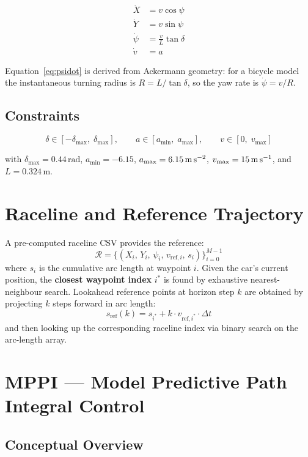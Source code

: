 \documentclass[11pt]{article}
\begin{document}
\begin{align}
\dot{X}   &= v \cos\psi \label{eq:xdot}\\
\dot{Y}   &= v \sin\psi \label{eq:ydot}\\
\dot{\psi} &= \frac{v}{L}\tan\delta \label{eq:psidot}\\
\dot{v}   &= a \label{eq:vdot}
\end{align}

Equation~\eqref{eq:psidot} is derived from Ackermann geometry: for a bicycle
model the instantaneous turning radius is $R = L / \tan\delta$, so the yaw rate
is $\dot{\psi} = v/R$.

\subsection{Constraints}

\[
\delta \in [-\delta_{\max},\; \delta_{\max}], \qquad
a     \in [a_{\min},\; a_{\max}], \qquad
v     \in [0,\; v_{\max}]
\]

with $\delta_{\max} = 0.44\,\text{rad}$, $a_{\min} = -6.15$, $a_{\max} = 6.15\,\text{m\,s}^{-2}$,
$v_{\max} = 15\,\text{m\,s}^{-1}$, and $L = 0.324\,\text{m}$.


\section{Raceline and Reference Trajectory}

A pre-computed raceline CSV provides the reference:
\[
\mathcal{R} = \{(X_i,\, Y_i,\, \psi_i,\, v_{\text{ref},i},\, s_i)\}_{i=0}^{M-1}
\]
where $s_i$ is the cumulative arc length at waypoint $i$.  Given the car's
current position, the \textbf{closest waypoint index} $i^*$ is found by
exhaustive nearest-neighbour search.  Lookahead reference points at horizon
step $k$ are obtained by projecting $k$ steps forward in arc length:
\[
s_{\text{ref}}(k) = s_{i^*} + k \cdot v_{\text{ref},i^*} \cdot \Delta t
\]
and then looking up the corresponding raceline index via binary search on the
arc-length array.


\section{MPPI --- Model Predictive Path Integral Control}

\subsection{Conceptual Overview}
\end{document}
